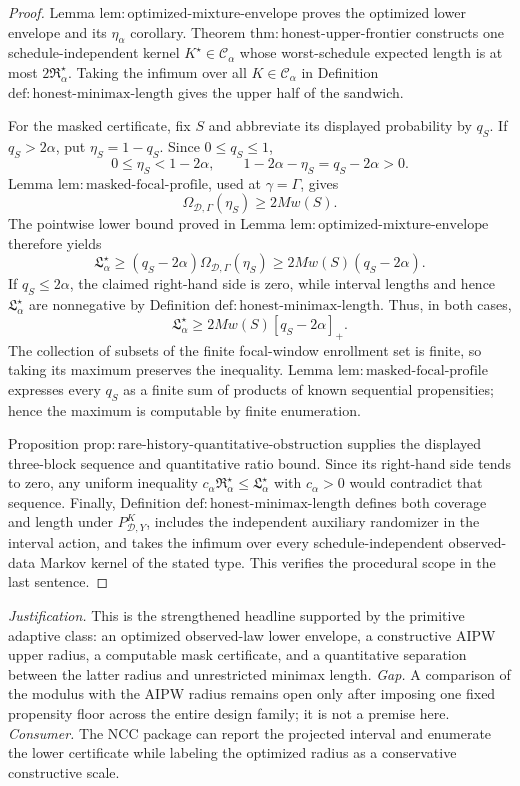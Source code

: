 \documentclass{article}
\begin{document}
\begin{proof}
Lemma \(\mathrm{lem:optimized\text{-}mixture\text{-}envelope}\) proves the optimized lower envelope and its \(\eta_\alpha\) corollary.  Theorem \(\mathrm{thm:honest\text{-}upper\text{-}frontier}\) constructs one schedule-independent kernel \(K^\star\in\mathcal C_\alpha\) whose worst-schedule expected length is at most \(2\mathfrak R_\alpha^\star\).  Taking the infimum over all \(K\in\mathcal C_\alpha\) in Definition \(\mathrm{def:honest\text{-}minimax\text{-}length}\) gives the upper half of the sandwich.

For the masked certificate, fix \(S\) and abbreviate its displayed probability by \(q_S\).  If \(q_S>2\alpha\), put \(\eta_S=1-q_S\).  Since \(0\le q_S\le1\),
\[
 0\le\eta_S<1-2\alpha,
 \qquad
 1-2\alpha-\eta_S=q_S-2\alpha>0.
\]
Lemma \(\mathrm{lem:masked\text{-}focal\text{-}profile}\), used at \(\gamma=\Gamma\), gives
\[
 \Omega_{\mathcal D,\Gamma}(\eta_S)\ge2Mw(S).
\]
The pointwise lower bound proved in Lemma \(\mathrm{lem:optimized\text{-}mixture\text{-}envelope}\) therefore yields
\[
 \mathfrak L_\alpha^\star
 \ge(q_S-2\alpha)\Omega_{\mathcal D,\Gamma}(\eta_S)
 \ge2Mw(S)(q_S-2\alpha).
\]
If \(q_S\le2\alpha\), the claimed right-hand side is zero, while interval lengths and hence \(\mathfrak L_\alpha^\star\) are nonnegative by Definition \(\mathrm{def:honest\text{-}minimax\text{-}length}\).  Thus, in both cases,
\[
 \mathfrak L_\alpha^\star\ge2Mw(S)[q_S-2\alpha]_+.
\]
The collection of subsets of the finite focal-window enrollment set is finite, so taking its maximum preserves the inequality.  Lemma \(\mathrm{lem:masked\text{-}focal\text{-}profile}\) expresses every \(q_S\) as a finite sum of products of known sequential propensities; hence the maximum is computable by finite enumeration.

Proposition \(\mathrm{prop:rare\text{-}history\text{-}quantitative\text{-}obstruction}\) supplies the displayed three-block sequence and quantitative ratio bound.  Since its right-hand side tends to zero, any uniform inequality \(c_\alpha\mathfrak R_\alpha^\star\le\mathfrak L_\alpha^\star\) with \(c_\alpha>0\) would contradict that sequence.  Finally, Definition \(\mathrm{def:honest\text{-}minimax\text{-}length}\) defines both coverage and length under \(P^K_{\mathcal D,Y}\), includes the independent auxiliary randomizer in the interval action, and takes the infimum over every schedule-independent observed-data Markov kernel of the stated type.  This verifies the procedural scope in the last sentence.
\end{proof}
\par\smallskip\noindent \textit{Justification.} This is the strengthened headline supported by the primitive adaptive class: an optimized observed-law lower envelope, a constructive AIPW upper radius, a computable mask certificate, and a quantitative separation between the latter radius and unrestricted minimax length. \textit{Gap.} A comparison of the modulus with the AIPW radius remains open only after imposing one fixed propensity floor across the entire design family; it is not a premise here. \textit{Consumer.} The NCC package can report the projected interval and enumerate the lower certificate while labeling the optimized radius as a conservative constructive scale.
\end{document}
